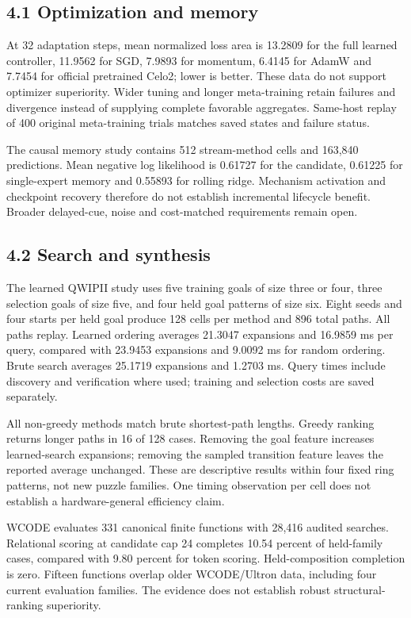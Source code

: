\documentclass[
]{article}
\begin{document}
\subsection{4.1 Optimization and memory}\label{optimization-and-memory}

At 32 adaptation steps, mean normalized loss area is 13.2809 for the
full learned controller, 11.9562 for SGD, 7.9893 for momentum, 6.4145
for AdamW and 7.7454 for official pretrained Celo2; lower is better.
These data do not support optimizer superiority. Wider tuning and longer
meta-training retain failures and divergence instead of supplying
complete favorable aggregates. Same-host replay of 400 original
meta-training trials matches saved states and failure status.

The causal memory study contains 512 stream-method cells and 163,840
predictions. Mean negative log likelihood is 0.61727 for the candidate,
0.61225 for single-expert memory and 0.55893 for rolling ridge.
Mechanism activation and checkpoint recovery therefore do not establish
incremental lifecycle benefit. Broader delayed-cue, noise and
cost-matched requirements remain open.

\subsection{4.2 Search and synthesis}\label{search-and-synthesis}

The learned QWIPII study uses five training goals of size three or four,
three selection goals of size five, and four held goal patterns of size
six. Eight seeds and four starts per held goal produce 128 cells per
method and 896 total paths. All paths replay. Learned ordering averages
21.3047 expansions and 16.9859 ms per query, compared with 23.9453
expansions and 9.0092 ms for random ordering. Brute search averages
25.1719 expansions and 1.2703 ms. Query times include discovery and
verification where used; training and selection costs are saved
separately.

All non-greedy methods match brute shortest-path lengths. Greedy ranking
returns longer paths in 16 of 128 cases. Removing the goal feature
increases learned-search expansions; removing the sampled transition
feature leaves the reported average unchanged. These are descriptive
results within four fixed ring patterns, not new puzzle families. One
timing observation per cell does not establish a hardware-general
efficiency claim.

WCODE evaluates 331 canonical finite functions with 28,416 audited
searches. Relational scoring at candidate cap 24 completes 10.54 percent
of held-family cases, compared with 9.80 percent for token scoring.
Held-composition completion is zero. Fifteen functions overlap older
WCODE/Ultron data, including four current evaluation families. The
evidence does not establish robust structural-ranking superiority.
\end{document}
